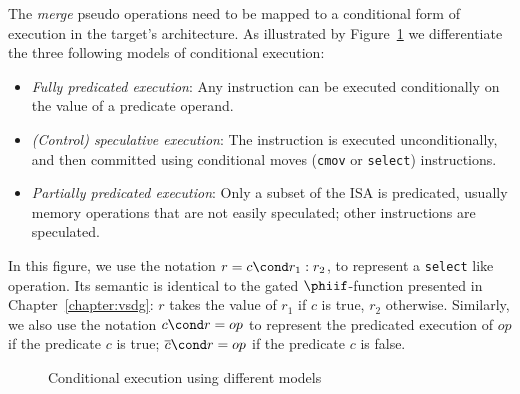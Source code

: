 The \textit{merge} pseudo operations need to be mapped to a conditional form of execution in the target's architecture. As illustrated by Figure~\ref{fig:pred} we differentiate the three following models of conditional execution:
\begin{itemize}
\item \emph{Fully predicated execution}: Any instruction can be executed conditionally on the value of a predicate operand.
\item \emph{(Control) speculative execution}: The instruction is executed unconditionally, and then committed using conditional moves (\texttt{cmov} or \texttt{select}) instructions.
\item \emph{Partially predicated execution}: Only a subset of the ISA is predicated, usually memory operations that are not easily speculated; other instructions are speculated.
\end{itemize}
In this figure, we use the notation $r = c \cond r_1:r_2$, to represent a \texttt{select} like operation. 
Its semantic is identical to the gated $\phiif$-function presented in Chapter~\ref{chapter:vsdg}: 
$r$ takes the value of $r_1$ if $c$ is true, $r_2$ otherwise. 
Similarly, we also use the notation $c \cond r = op$ to represent the predicated execution of $op$ if the predicate $c$ is true; 
$\overline{c} \cond r = op$ if the predicate $c$ is false.

\begin{figure}[h]
\footnotesize
{}
\hfill
{} \hfill
{}
\caption{Conditional execution using different models}
\label{fig:pred}
\end{figure}

